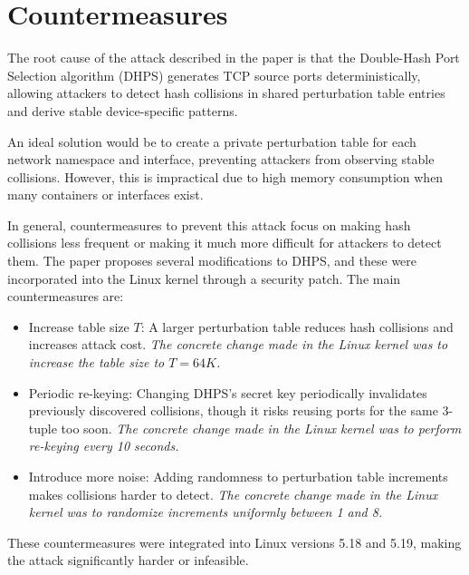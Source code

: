 \documentclass{report}
\begin{document}
\vspace{0.5cm}
\chapter{Countermeasures}
\label{sec:countermeasures}

The \alert{root cause} of the attack described in the paper is that the Double-Hash Port Selection algorithm (DHPS) generates TCP source ports deterministically, allowing attackers to detect hash collisions in shared perturbation table entries and derive stable device-specific patterns.

An \alert{ideal solution} would be to create a private perturbation table for each network namespace and interface, preventing attackers from observing stable collisions. However, this is impractical due to high memory consumption when many containers or interfaces exist.

In \alert{general}, \alert{countermeasures} to prevent this attack focus on making hash collisions less frequent or making it much more difficult for attackers to detect them. The paper proposes several modifications to DHPS, and these were incorporated into the Linux kernel through a security patch. The main countermeasures are:

\begin{itemize}
	\item \alert{Increase table size $T$:}
	A larger perturbation table reduces hash collisions and increases attack cost.
	\textit{The concrete change made in the Linux kernel was to increase the table size to $T = 64K$.}

	\item \alert{Periodic re-keying:}
	Changing DHPS’s secret key periodically invalidates previously discovered collisions, though it risks reusing ports for the same 3-tuple too soon.
	\textit{The concrete change made in the Linux kernel was to perform re-keying every 10 seconds.}

	\item \alert{Introduce more noise:}
	Adding randomness to perturbation table increments makes collisions harder to detect.
	\textit{The concrete change made in the Linux kernel was to randomize increments uniformly between 1 and 8.}
\end{itemize}

These countermeasures were integrated into Linux versions 5.18 and 5.19, making the attack significantly harder or infeasible.

\vspace{0.5cm}
\end{document}

